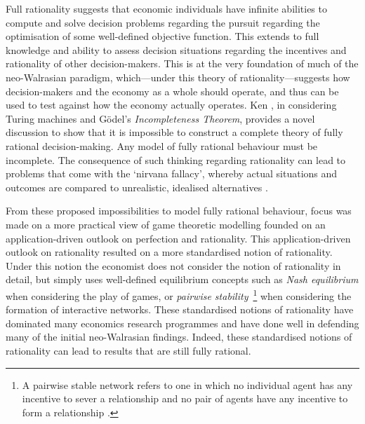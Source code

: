 Full rationality suggests that economic individuals have infinite abilities to compute and solve decision problems regarding the pursuit regarding the optimisation of some well-defined objective function. This extends to full knowledge and ability to assess decision situations regarding the incentives and rationality of other decision-makers. This is at the very foundation of much of the neo-Walrasian paradigm, which---under this theory of rationality---suggests how decision-makers and the economy as a whole should operate, and thus can be used to test against how the economy actually operates. Ken \citet{Binmore1987a, Binmore1987b}, in considering Turing machines and G\"{o}del's \emph{Incompleteness Theorem}, provides a novel discussion to show that it is impossible to construct a complete theory of fully rational decision-making. Any model of fully rational behaviour must be incomplete. The consequence of such thinking regarding rationality can lead to problems that come with the `nirvana fallacy', whereby actual situations and outcomes are compared to unrealistic, idealised alternatives \citep{Demsetz1969}.

From these proposed impossibilities to model fully rational behaviour, focus was made on a more practical view of game theoretic modelling founded on an application-driven outlook on perfection and rationality. This application-driven outlook on rationality resulted on a more standardised notion of rationality. Under this notion the economist does not consider the notion of rationality in detail, but simply uses well-defined equilibrium concepts such as \emph{Nash equilibrium} \citep{Nash1951} when considering the play of games, or \emph{pairwise stability}~\footnote{A pairwise stable network refers to one in which no individual agent has any incentive to sever a relationship and no pair of agents have any incentive to form a relationship \citep{JacksonWolinsky1996, JacksonWatts2002WP}.} when considering the formation of interactive networks. These standardised notions of rationality have dominated many economics research programmes and have done well in defending many of the initial neo-Walrasian findings. Indeed, these standardised notions of rationality can lead to results that are still fully rational.

